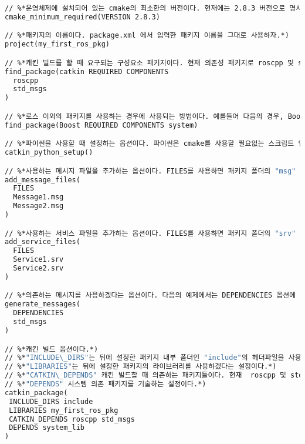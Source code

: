 \begin{lstlisting}[language=make,backgroundcolor=\color{white}]
// %*운영체제에 설치되어 있는 cmake의 최소한의 버전이다. 현재에는 2.8.3 버전으로 명시되어 있다. 이 보다 낮은 cmake를 사용하는 경우에는 버전 업데이트를 해줘야 한다.*)
cmake_minimum_required(VERSION 2.8.3)

// %*패키지의 이름이다. package.xml 에서 입력한 패키지 이름을 그대로 사용하자.*)
project(my_first_ros_pkg)

// %*캐킨 빌드를 할 때 요구되는 구성요소 패키지이다. 현재 의존성 패키지로 roscpp 및 std\_msgs가 추가되어 있다. 여기에 입력된 패키지가 없는 경우 캐킨 빌드할 때 사용자에게 에러가 표시된다. 즉, 사용자가 만든 패키지가 의존하는 패키지를 먼저 설치하게 만드는 옵션이다.*)
find_package(catkin REQUIRED COMPONENTS
  roscpp
  std_msgs
)

// %*로스 이외의 패키지를 사용하는 경우에 사용되는 방법이다. 예를들어 다음의 경우, Boost를 사용할때 system 이라는 패키지가 설되어 있어야 한다. 기능은 위에서 설명한 의존하는 패키지를 먼저 설치하게 만드는 옵션이다.*)
find_package(Boost REQUIRED COMPONENTS system)

// %*파이썬을 사용할 때 설정하는 옵션이다. 파이썬은 cmake를 사용할 필요없는 스크립트 언어이지만 패키지의 호환성을 위해 아래와 같이 독자적인 설정을 하게 되어 있다.*)
catkin_python_setup()

// %*사용하는 메시지 파일을 추가하는 옵션이다. FILES를 사용하면 패키지 폴더의 "msg" 안의 .msg 파일들을 참조하게 된다. 다음의 예제에서는 Message1.msg 및 Message2.msg 의 메시지 파일을 이용하겠다는 옵션이다.*)
add_message_files(
  FILES
  Message1.msg
  Message2.msg
)

// %*사용하는 서비스 파일을 추가하는 옵션이다. FILES를 사용하면 패키지 폴더의 "srv" 안의 .srv 파일들을 참조하게 된다. 다음의 예제에서는 Service1.srv 및 Service2.srv 의 서비스 파일을 이용하겠다는 옵션이다.*)
add_service_files(
  FILES
  Service1.srv
  Service2.srv
)

// %*의존하는 메시지를 사용하겠다는 옵션이다. 다음의 예제에서는 DEPENDENCIES 옵션에 의하여 std\_msgs 라는 메시지 패키지를 사용하겠다는 설정이다.*)
generate_messages(
  DEPENDENCIES
  std_msgs
)

// %*캐킨 빌드 옵션이다.*)
// %*"INCLUDE\_DIRS"는 뒤에 설정한 패키지 내부 폴더인 "include"의 헤더파일을 사용하겠다는 설정이다.*)
// %*"LIBRARIES"는 뒤에 설정한 패키지의 라이브러리를 사용하겠다는 설정이다.*)
// %*"CATKIN\_DEPENDS" 캐킨 빌드할 때 의존하는 패키지들이다. 현재  roscpp 및 std\_msgs가 의존하고 있다는 설정이다.*)
// %*"DEPENDS" 시스템 의존 패키지를 기술하는 설정이다.*)
catkin_package(
 INCLUDE_DIRS include
 LIBRARIES my_first_ros_pkg
 CATKIN_DEPENDS roscpp std_msgs
 DEPENDS system_lib
)


\end{lstlisting}
